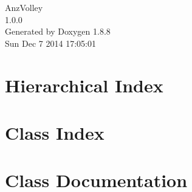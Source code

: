 \documentclass[twoside]{book}
\newcommand{\+}{\discretionary{\mbox{\scriptsize$\hookleftarrow$}}{}{}}
\newcommand{\clearemptydoublepage}{%
  \newpage{\pagestyle{empty}\cleardoublepage}%
}
\begin{document}
\hypersetup{pageanchor=false,
             bookmarks=true,
             bookmarksnumbered=true,
             pdfencoding=unicode
            }
\begin{titlepage}
\vspace*{7cm}
\begin{center}%
{\Large Anz\+Volley \\[1ex]\large 1.\+0.\+0 }\\
\vspace*{1cm}
{\large Generated by Doxygen 1.8.8}\\
\vspace*{0.5cm}
{\small Sun Dec 7 2014 17:05:01}\\
\end{center}
\end{titlepage}
\clearemptydoublepage
\tableofcontents
\clearemptydoublepage
{}
\hypersetup{pageanchor=true}

\chapter{Hierarchical Index}

\chapter{Class Index}

\chapter{Class Documentation}














\newpage
{}
{}
\printindex
\end{document}
